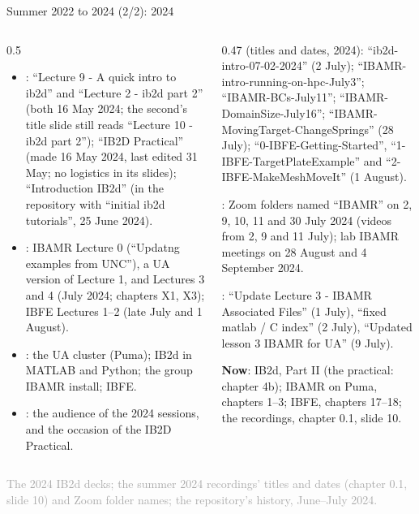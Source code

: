 \documentclass[aspectratio=169,11pt]{beamer}
\newcommand{\sourcecredit}[1]{\vfill\begin{flushright}\tiny\textcolor{DarkGray}{#1}\end{flushright}}
\begin{document}
\begin{frame}{Summer 2022 to 2024 (2/2): 2024}
\label{fr:summers2}
\begin{columns}[T,onlytextwidth]
\begin{column}{0.5\textwidth}
\footnotesize
\begin{itemize}\setlength{\itemsep}{3pt}
  \item {}: ``Lecture 9 - A quick intro to ib2d'' and ``Lecture 2 - ib2d part 2'' (both 16 May 2024; the second's title slide still reads ``Lecture 10 - ib2d part 2''); ``IB2D Practical'' (made 16 May 2024, last edited 31 May; no logistics in its slides); ``Introduction IB2d'' (in the repository with ``initial ib2d tutorials'', 25 June 2024).
  \item {}: IBAMR Lecture 0 (``Updatng examples from UNC''), a UA version of Lecture 1, and Lectures 3 and 4 (July 2024; chapters X1, X3); IBFE Lectures 1--2 (late July and 1 August).
  \item {}: the UA cluster (Puma); IB2d in MATLAB and Python; the group IBAMR install; IBFE.
  \item {}: the audience of the 2024 sessions, and the occasion of the IB2D Practical.
\end{itemize}
\end{column}
\begin{column}{0.47\textwidth}
\scriptsize
{} (titles and dates, 2024): ``ib2d-intro-07-02-2024'' (2 July); ``IBAMR-intro-running-on-hpc-July3''; ``IBAMR-BCs-July11''; ``IBAMR-DomainSize-July16''; ``IBAMR-MovingTarget-ChangeSprings'' (28 July); ``0-IBFE-Getting-Started'', ``1-IBFE-TargetPlateExample'' and ``2-IBFE-MakeMeshMoveIt'' (1 August).

\vspace{1mm}
: Zoom folders named ``IBAMR'' on 2, 9, 10, 11 and 30 July 2024 (videos from 2, 9 and 11 July); lab IBAMR meetings on 28 August and 4 September 2024.

\vspace{1mm}
: ``Update Lecture 3 - IBAMR Associated Files'' (1 July), ``fixed matlab / C index'' (2 July), ``Updated lesson 3 IBAMR for UA'' (9 July).

\begin{homebox}
\scriptsize \textbf{Now}: IB2d, Part II (the practical: chapter 4b); IBAMR on Puma, chapters 1--3; IBFE, chapters 17--18; the recordings, chapter 0.1, slide 10.
\end{homebox}
\end{column}
\end{columns}
\sourcecredit{The 2024 IB2d decks; the summer 2024 recordings' titles and dates (chapter 0.1, slide 10) and Zoom folder names; the repository's history, June--July 2024.}
\end{frame}
\end{document}
